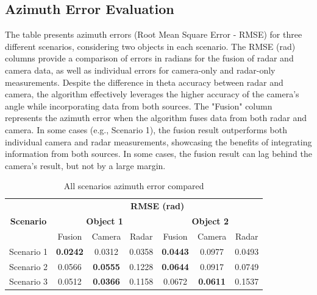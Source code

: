 \subsection{Azimuth Error Evaluation}\label{sec:3-theta}
The table presents azimuth errors (Root Mean Square Error - RMSE) for three different scenarios, 
considering two objects in each scenario.
The RMSE (rad) columns provide a comparison of errors in radians 
for the fusion of radar and camera data, 
as well as individual errors for camera-only and radar-only measurements.
Despite the difference in theta accuracy between radar and camera, 
the algorithm effectively leverages the higher accuracy of the camera's angle while incorporating data from both sources.
The "Fusion" column represents the azimuth error when the algorithm fuses data from both radar and camera. 
In some cases (e.g., Scenario 1), the fusion result outperforms both individual camera and radar measurements, 
showcasing the benefits of integrating information from both sources.
In some cases, the fusion result can lag behind the camera's result, but not by a large margin.
\begin{table}[h!]
    \begin{center}
      \label{tab:table2}
      \begin{tabular}{c|c|c|c|c|c|c} %
        \multirow{3}{*}{\textbf{Scenario}} & \multicolumn{6}{c}{\textbf{RMSE (rad)}}\\\cline{2-7}
                                            & \multicolumn{3}{c|}{\textbf{Object 1}}  & \multicolumn{3}{c}{\textbf{Object 2}}\\
        \cline{2-7}
                   & Fusion & Camera & Radar & Fusion & Camera & Radar \\
        \hline
        Scenario 1 & \textbf{0.0242} & 0.0312 & 0.0358 & \textbf{0.0443}  & 0.0977 & 0.0493 \\
        Scenario 2 & 0.0566 & \textbf{0.0555} & 0.1228 & \textbf{0.0644} & 0.0917 & 0.0749 \\
        Scenario 3 & 0.0512 & \textbf{0.0366} & 0.1158 & 0.0672 & \textbf{0.0611} & 0.1537 \\
      \end{tabular}
    \end{center}
    \caption{All scenarios azimuth error compared}
    \label{tab:scenarios_rmse}
  \end{table}

  
